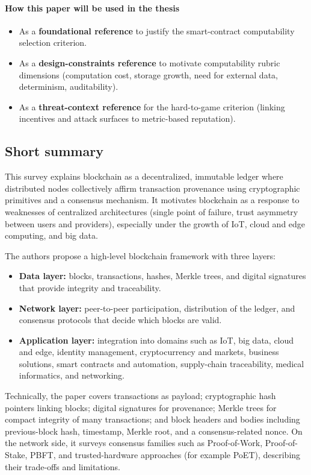 \documentclass[11pt,a4paper]{article}
\begin{document}
\paragraph{How this paper will be used in the thesis}
\begin{itemize}[leftmargin=*]
  \item As a \textbf{foundational reference} to justify the smart-contract computability selection criterion.
  \item As a \textbf{design-constraints reference} to motivate computability rubric dimensions (computation cost, storage growth, need for external data, determinism, auditability).
  \item As a \textbf{threat-context reference} for the hard-to-game criterion (linking incentives and attack surfaces to metric-based reputation).
\end{itemize}

\subsection{Short summary}
This survey explains blockchain as a decentralized, immutable ledger where distributed nodes collectively affirm transaction provenance using cryptographic primitives and a consensus mechanism. It motivates blockchain as a response to weaknesses of centralized architectures (single point of failure, trust asymmetry between users and providers), especially under the growth of IoT, cloud and edge computing, and big data.

The authors propose a high-level blockchain framework with three layers:
\begin{itemize}[leftmargin=*]
  \item \textbf{Data layer:} blocks, transactions, hashes, Merkle trees, and digital signatures that provide integrity and traceability.
  \item \textbf{Network layer:} peer-to-peer participation, distribution of the ledger, and consensus protocols that decide which blocks are valid.
  \item \textbf{Application layer:} integration into domains such as IoT, big data, cloud and edge, identity management, cryptocurrency and markets, business solutions, smart contracts and automation, supply-chain traceability, medical informatics, and networking.
\end{itemize}

Technically, the paper covers transactions as payload; cryptographic hash pointers linking blocks; digital signatures for provenance; Merkle trees for compact integrity of many transactions; and block headers and bodies including previous-block hash, timestamp, Merkle root, and a consensus-related nonce. On the network side, it surveys consensus families such as Proof-of-Work, Proof-of-Stake, PBFT, and trusted-hardware approaches (for example PoET), describing their trade-offs and limitations.
\end{document}
